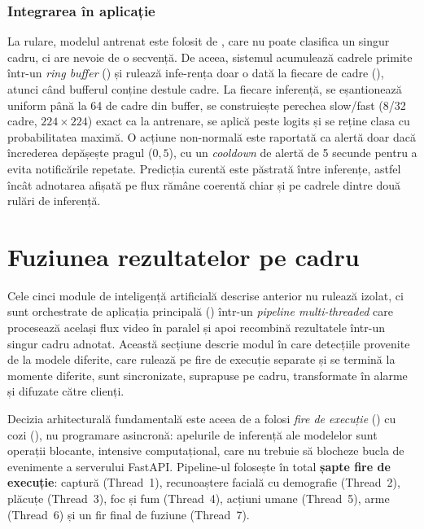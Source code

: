 \documentclass[../../main.tex]{subfiles}
\begin{document}
\subsubsection{Integrarea în aplicație}
La rulare, modelul antrenat este folosit de , care nu
poate clasifica un singur cadru, ci are nevoie de o secvență. De aceea, sistemul acumulează
cadrele primite într-un \textit{ring buffer} () și rulează infe-rența doar o dată
la fiecare  de cadre (), atunci când bufferul
conține destule cadre. La fiecare inferență, se eșantionează uniform până la 64 de cadre din
buffer, se construiește perechea slow/fast (8/32 cadre, $224 \times 224$) exact ca la antrenare, se
aplică  peste logits și se reține clasa cu probabilitatea maximă. O acțiune
non-normală este raportată ca alertă doar dacă încrederea depășește pragul
 ($0{,}5$), cu un \textit{cooldown} de alertă de 5 secunde pentru
a evita notificările repetate. Predicția curentă este păstrată între inferențe, astfel încât
adnotarea afișată pe flux rămâne coerentă chiar și pe cadrele dintre două rulări de inferență.

\section{Fuziunea rezultatelor pe cadru}
\label{sec:fuziune}

Cele cinci module de inteligență artificială descrise anterior nu rulează izolat, ci sunt
orchestrate de aplicația principală () într-un \textit{pipeline
multi-threaded} care procesează același flux video în paralel și apoi recombină rezultatele
într-un singur cadru adnotat. Această secțiune descrie modul în care detecțiile provenite de la
modele diferite, care rulează pe fire de execuție separate și se termină la momente diferite,
sunt sincronizate, suprapuse pe cadru, transformate în alarme și difuzate către clienți.

Decizia arhitecturală fundamentală este aceea de a folosi \textit{fire de execuție}
() cu cozi (), nu programare asincronă: apelurile
de inferență ale modelelor sunt operații blocante, intensive computațional, care nu trebuie să
blocheze bucla de evenimente a serverului FastAPI. Pipeline-ul folosește în total
\textbf{șapte fire de execuție}: captură (Thread~1), recunoaștere facială cu demografie
(Thread~2), plăcuțe (Thread~3), foc și fum (Thread~4), acțiuni umane (Thread~5), arme (Thread~6)
și un fir final de fuziune (Thread~7).
\end{document}
